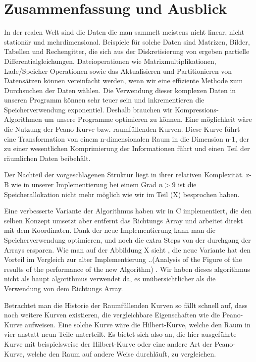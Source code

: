 \documentclass[course=asp]{aspdoc}
\begin{document}
\section{Zusammenfassung und Ausblick} \label{Zusammenfassung und Ausblick}
In der realen Welt sind die Daten die man sammelt meistens nicht linear, nicht station\"ar und mehrdimensional. Beispiele f\"ur solche Daten sind Matrizen, Bilder, Tabellen und Rechengitter, die sich aus der Diskretisierung von ergeben partielle Differentialgleichungen. Dateioperationen wie Matrixmultiplikationen, Lade/Speicher Operationen sowie das Aktualisieren und Partitionieren von Datens\"atzen k\"onnen vereinfacht werden, wenn wir eine effiziente Methode zum Durchsuchen der Daten w\"ahlen. Die Verwendung dieser komplexen  Daten in unseren Programm k\"onnen sehr teuer sein und inkrementieren die Speicherverwendung exponentiel. Deshalb brauchen wir Kompressions-Algorithmen um unsere Programme optimieren zu k\"onnen. Eine m\"oglichkeit w\"are die Nutzung der Peano-Kurve bzw. raumf\"ullenden Kurven. Diese Kurve f\"uhrt eine Transformation von einem n-dimensionalen Raum in die Dimension n-1, der zu einer wesentlichen Komprimierung der Informationen f\"uhrt und einen Teil der r\"aumlichen Daten beibeh\"alt.

Der Nachteil der vorgeschlagenen Struktur liegt in ihrer relativen Komplexit\"at. z-B wie in unserer Implementierung bei einem Grad $n > 9$  ist die Speicherallokation nicht mehr m\"oglich wie wir im Teil (X) besprochen haben.

Eine verbesserte Variante der Algorithmus haben wir in C implementiert, die den selben Konzept umsetzt aber entfernt das Richtungs Array und arbeitet direkt mit dem Koordinaten. Dank der neue Implementierung kann man die Speicherverwendung optimieren, und noch die extra Steps von der durchgang der Arrays ersparen. Wie man auf der Abbildung X sieht , die neue Variante hat den Vorteil im Vergleich zur alter Implementierung ..(Analysis of the Figure of the results of the performance of the new Algorithm) . Wir haben dieses algorithmus nicht als haupt algorithmus verwendet da, es un\"ubersichtlicher als die Verwendung von dem Richtungs Array. 


Betrachtet man die Historie der Raumf\"ullenden Kurven so f\"allt schnell auf, dass noch weitere Kurven existieren, die vergleichbare Eigenschaften wie die Peano-Kurve aufweisen. Eine solche Kurve w\"are die Hilbert-Kurve, welche den Raum in vier anstatt neun Teile unterteilt. Es bietet sich also an, die hier ausgef\"uhrte Kurve mit beispielsweise der Hilbert-Kurve oder eine andere Art der Peano-Kurve, welche den Raum auf andere Weise durchl\"auft, zu vergleichen. %
\end{document}
